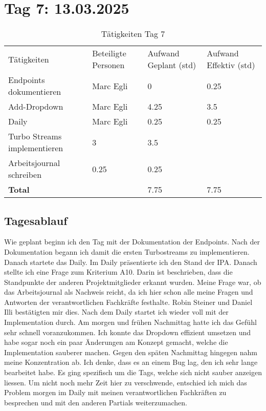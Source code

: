 \section{Tag 7: 13.03.2025}
\begin{table}[H]
    \begin{tabular}{|L{0.4\textwidth}|C{60pt}|C{60pt}|C{60pt}|}
        \hline
        \color{white}Tätigkeiten & \color{white}Beteiligte \color{white}Personen & \color{white}Aufwand Geplant (std) & \color{white}Aufwand Effektiv (std) \\
        Endpoints dokumentieren & Marc Egli & 0 & 0.25 \\
        \hline
        Add-Dropdown & Marc Egli & 4.25 & 3.5 \\
        \hline
        Daily & Marc Egli & 0.25 & 0.25 \\
        \hline
        Turbo Streams implementieren & 3 & 3.5 \\
        \hline
        Arbeitsjournal schreiben & 0.25 & 0.25 \\
        \textbf{Total} &  & 7.75 & 7.75 \\
        \hline
    \end{tabular}
    \caption{Tätigkeiten Tag 7}
\end{table}

\subsection*{Tagesablauf}
Wie geplant beginn ich den Tag mit der Dokumentation der Endpoints. Nach der Dokumentation begann ich damit die ersten Turbostreams zu implementieren.
Danach startete das Daily. Im Daily präsentierte ich den Stand der IPA. Danach stellte ich eine Frage zum Kriterium A10. Darin ist beschrieben, dass die Standpunkte der
anderen Projektmitglieder erkannt wurden. Meine Frage war, ob das Arbeitsjournal als Nachweis reicht, da ich hier schon alle meine Fragen und Antworten der verantwortlichen 
Fachkräfte festhalte. Robin Steiner und Daniel Illi bestätigten mir dies. Nach dem Daily startet ich wieder voll mit der Implementation durch. 
Am morgen und frühen Nachmittag hatte ich das Gefühl sehr schnell voranzukommen. Ich konnte das Dropdown effizient umsetzen und habe sogar noch ein paar Änderungen am Konzept gemacht,
welche die Implementation sauberer machen. Gegen den späten Nachmittag hingegen nahm meine Konzentration ab. Ich denke, dass es an einem Bug lag, den ich sehr lange
bearbeitet habe. Es ging spezifisch um die Tags, welche sich nicht sauber anzeigen liessen. Um nicht noch mehr Zeit hier zu verschwende, entschied ich mich
das Problem morgen im Daily mit meinen verantwortlichen Fachkräften zu besprechen und mit den anderen Partials weiterzumachen. 

